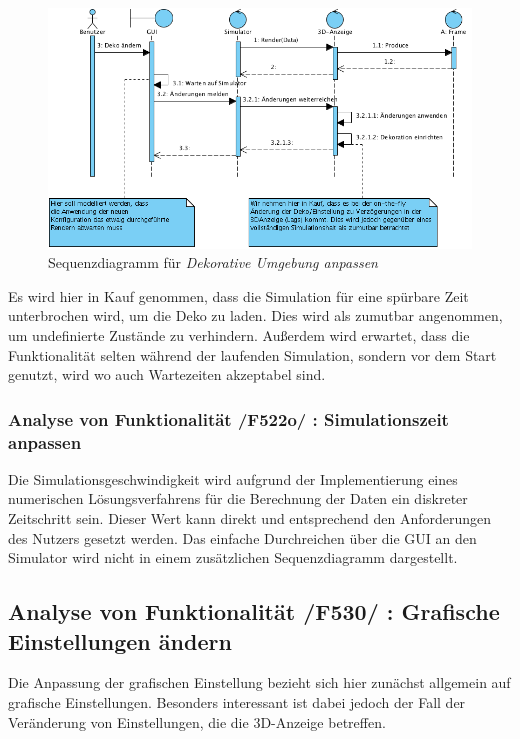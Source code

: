 \begin{figure}
\includegraphics[width=16cm]{bilder/change_graphic_deko}
\caption{Sequenzdiagramm für \textit{Dekorative Umgebung anpassen}}
\label{labelname}
\end{figure}
Es wird hier in Kauf genommen, dass die Simulation für eine spürbare Zeit unterbrochen wird, um die Deko zu laden. Dies wird als zumutbar angenommen, um undefinierte Zustände zu verhindern. 
Außerdem wird erwartet, dass die Funktionalität selten während der laufenden Simulation, sondern vor dem Start genutzt, wird wo auch Wartezeiten akzeptabel sind.

\subsubsection{Analyse von Funktionalität /F522o/ :  Simulationszeit anpassen}
Die Simulationsgeschwindigkeit wird aufgrund der Implementierung eines numerischen Lösungsverfahrens für die Berechnung der Daten ein diskreter Zeitschritt sein. Dieser Wert kann direkt und entsprechend
den Anforderungen des Nutzers gesetzt werden. Das einfache Durchreichen über die GUI an den Simulator wird nicht in einem zusätzlichen Sequenzdiagramm dargestellt.
\subsection{Analyse von Funktionalität /F530/ :  Grafische Einstellungen ändern}
Die Anpassung der grafischen Einstellung bezieht sich hier zunächst allgemein auf grafische Einstellungen. Besonders interessant ist dabei jedoch der Fall der Veränderung von Einstellungen, die 
die 3D-Anzeige betreffen. 


